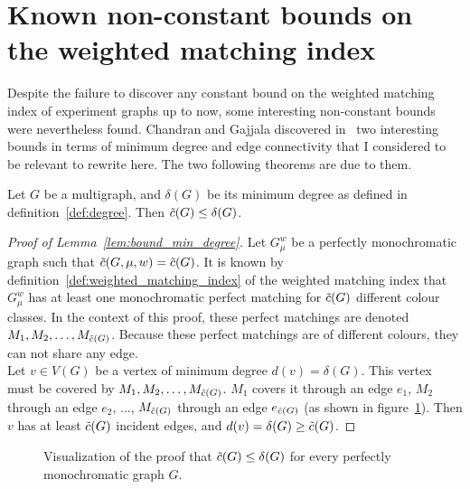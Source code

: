 \section{Known non-constant bounds on the weighted matching index}
\label{sec:known-non-constant-bounds}

Despite the failure to discover any constant bound on the weighted matching index of experiment graphs up to now, some interesting non-constant bounds were nevertheless found.
Chandran and Gajjala discovered in~\cite{chandran} two interesting bounds in terms of minimum degree and edge connectivity that I considered to be relevant to rewrite here.
The two following theorems are due to them.

\begin{lemma}
    \label{lem:bound_min_degree}
    Let $G$ be a multigraph, and $\delta(G)$ be its minimum degree as defined in definition~\ref{def:degree}.
    Then $\Tilde{c}(G) \leq \delta(G)$.
\end{lemma}

\begin{proof}[Proof of Lemma~\ref{lem:bound_min_degree}]
    Let $G_\mu^w$ be a perfectly monochromatic graph such that $\Tilde{c}(G, \mu, w) = \Tilde{c}(G)$.
    It is known by definition~\ref{def:weighted_matching_index} of the weighted matching index that $G_\mu^w$ has at least one monochromatic perfect matching for $\Tilde{c}(G)$ different colour classes.
    In the context of this proof, these perfect matchings are denoted $M_1, M_2, \dots, M_{\Tilde{c}(G)}$.
    Because these perfect matchings are of different colours, they can not share any edge.\\
    
    Let $v \in V(G)$ be a vertex of minimum degree $d(v) = \delta(G)$.
    This vertex must be covered by $M_1, M_2, \dots, M_{\Tilde{c}(G)}$.
    $M_1$ covers it through an edge $e_1$, $M_2$ through an edge $e_2$, $\dots$, $M_{\Tilde{c}(G)}$ through an edge $e_{\Tilde{c}(G)}$ (as shown in figure~\ref{fig:proof_min_degree}).
    Then $v$ has at least $\Tilde{c}(G)$ incident edges, and $d(v) = \delta(G) \geq \Tilde{c}(G)$.
\end{proof}

\begin{figure}[H]
    \caption{Visualization of the proof that $\Tilde{c}(G) \leq \delta(G)$ for every perfectly monochromatic graph $G$.}
    \label{fig:proof_min_degree}
\end{figure}

